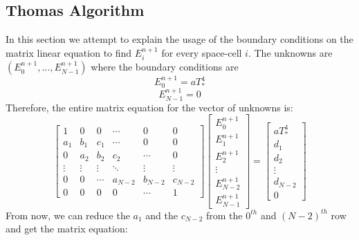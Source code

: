 \documentclass{article}
\begin{document}
\subsection*{Thomas Algorithm}
In this section we attempt to explain the usage of the boundary conditions on the matrix linear equation to find $E_i^{n+1}$ for every space-cell $i$.
The unknowns are $(E_0^{n+1},...,E_{N-1}^{n+1})$ where the boundary conditions are 
\begin{equation}
    E_0^{n+1}=aT_*^4 
\end{equation}
\begin{equation}
    E_{N-1}^{n+1}=0
\end{equation}
Therefore, the entire matrix equation for the vector of unknowns is:
\begin{equation}
\begin{bmatrix}
1 & 0 & 0 & \cdots & 0 & 0\\
a_1 & b_1 & c_1 & \cdots & 0 & 0 \\  
0 & a_2 & b_2 & c_2 &\cdots & 0 \\
\vdots & \vdots & \vdots & \ddots & \vdots & \vdots \\
0 & 0 & \cdots & a_{N-2} & b_{N-2} & c_{N-2}  \\
0 & 0 & 0 & 0 & \cdots & 1
\end{bmatrix}
\begin{bmatrix}
E_0^{n+1} \\
E_1^{n+1} \\
E_2^{n+1} \\
\vdots \\
E_{N-2}^{n+1} \\
E_{N-1}^{n+1}
\end{bmatrix}
=
\begin{bmatrix}
aT_*^4 \\
d_1 \\
d_2 \\
\vdots \\
d_{N-2} \\
0
\end{bmatrix}
\end{equation}
From now, we can reduce the $a_1$ and the $c_{N-2}$ from the $0^{th}$ and $(N-2)^{th}$ row and get the matrix equation:
\end{document}
